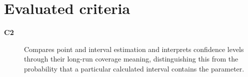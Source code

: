 \newcommand{\InformationTable}[1]{%
    \begingroup
    \small
    \setlength{\tabcolsep}{4pt}
    \renewcommand{\arraystretch}{1.16}
    \noindent
    \begin{tabularx}{\linewidth}{@{}>{\raggedright\arraybackslash}p{0.07\linewidth}>{\raggedright\arraybackslash}p{0.18\linewidth}>{\raggedright\arraybackslash}p{0.19\linewidth}>{\raggedright\arraybackslash}X@{}}
        \toprule
        \textbf{Symbol} & \textbf{Concept} & \textbf{Type} & \textbf{Meaning in context} \\
        \midrule
        #1
        \bottomrule
    \end{tabularx}\par
    \vspace{2mm}
    \endgroup
}

\newcommand{\EstimationTable}[1]{%
    \noindent
    \begin{tabularx}{\linewidth}{@{}>{\raggedright\arraybackslash}p{0.17\linewidth}>{\raggedright\arraybackslash}p{0.49\linewidth}>{\raggedright\arraybackslash}X@{}}
        \toprule
        \textbf{Quantity} & \textbf{Calculation and result} & \textbf{Meaning in context} \\
        \midrule
        #1
        \bottomrule
    \end{tabularx}\par
    \vspace{2mm}
}



\maketitle

\setcounter{tocdepth}{1}
\setcounter{secnumdepth}{2}
\label{toc}
\tableofcontents

\section*{Evaluated criteria}
\begin{description}
    \item[\textbf{C2}] Compares point and interval estimation and interprets confidence levels through their long-run coverage meaning, distinguishing this from the probability that a particular calculated interval contains the parameter.
\end{description}

